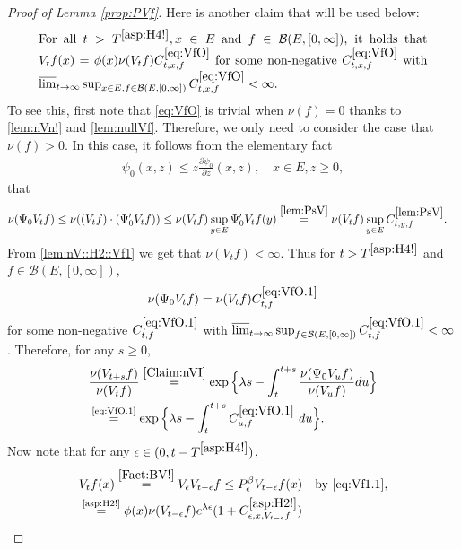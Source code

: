 \documentclass[12pt,a4paper]{amsart}
\numberwithin{equation}{section}
\theoremstyle{plain}
\theoremstyle{definition}
\theoremstyle{remark}
\begin{document}
\begin{proof}[Proof of Lemma \ref{prop:PVf}]
	
	Here is another claim that will be used below:
\begin{equation}
\begin{minipage}{0.9\textwidth}
	For all $t> T^{\eqref{asp:H4!}}, x\in E$ and $f\in \mathcal B(E,[0,\infty])$, it holds that $V_t f(x) = \phi(x) \nu(V_tf) C^{\eqref{eq:VfO}}_{t,x,f}$ for some non-negative $C^{\eqref{eq:VfO}}_{t,x,f}$ with $\varlimsup_{t\to \infty} \sup_{x\in E, f\in \mathcal B(E,[0,\infty])} C^{\eqref{eq:VfO}}_{t,x,f} <\infty$.
\end{minipage} \label{eq:VfO}
\end{equation}
	To see this, first note that \eqref{eq:VfO} is trivial when $\nu(f) = 0$ thanks to \eqref{lem:nVn!} and \eqref{lem:nullVf}.
	Therefore, we only need to consider the case that $\nu(f)>0$.
	In this case, it follows from the elementary fact
\begin{align}\label{e:derofpsi0}
	\psi_0(x,z)
	\leq z \frac{\partial \psi_0}{\partial z}(x,z),
	\quad x\in E, z\geq 0,
\end{align}
	that
\begin{align}
	&\nu(\Psi_0 V_tf)
	\leq \nu((V_tf)\cdot (\Psi_0' V_tf)) \leq \nu(V_tf) \sup_{y\in E} \Psi_0' V_tf(y)
	\overset{\eqref{lem:PsV}}= \nu(V_tf) \sup_{y\in E} C^{\eqref{lem:PsV}}_{t,y,f}.
\end{align}
	From \eqref{lem:nV::H2::Vf1}  we get that $\nu(V_tf) <\infty$.
	Thus for $t> T^{\eqref{asp:H4!}}$ and $f\in \mathcal B(E,[0,\infty])$,
\begin{equation}
	\nu(\Psi_0 V_t f)  = \nu(V_tf) C^{\eqref{eq:VfO.1}}_{t,f} \label{eq:VfO.1}
\end{equation}
	for some non-negative $C^{\eqref{eq:VfO.1}}_{t,f} $ with $\varlimsup_{t\to \infty} \sup_{f\in \mathcal B(E,[0,\infty])}C^{\eqref{eq:VfO.1}}_{t,f}  < \infty$.
	Therefore, for any $s\geq 0$,
\begin{align}
	&  \frac{\nu(V_{t+s} f)} {\nu(V_t f)} \overset{\eqref{Claim:nVI}}= \exp\Big\{ \lambda s - \int_t^{t+s} \frac{\nu(\Psi_0 V_u f) }{\nu(V_u f)} du\Big\}
	\\&\label{eq:VfO.2} \overset{\text{\eqref{eq:VfO.1}}}= \exp\Big\{ \lambda s - \int_t^{t+s} C^{\eqref{eq:VfO.1}}_{u,f} ~du\Big\}.
\end{align}
Now note that for any $\epsilon\in (0, t- T^{\eqref{asp:H4!}})$,
\begin{align}
	&V_{t}f(x) \overset{\eqref{Fact:BV!}}= V_{\epsilon} V_{t-\epsilon} f\leq P_\epsilon^\beta V_{t-\epsilon} f(x)\quad\text{by \eqref{eq:Vf1.1}},
	\\& \overset{\text{\eqref{asp:H2!}}}= \phi(x) \nu(V_{t-\epsilon}f) e^{\lambda  \epsilon} (1+C_{\epsilon,x, V_{t-\epsilon} f}^{\eqref{asp:H2!}} )

\end{align}
\end{proof}
\end{document}
